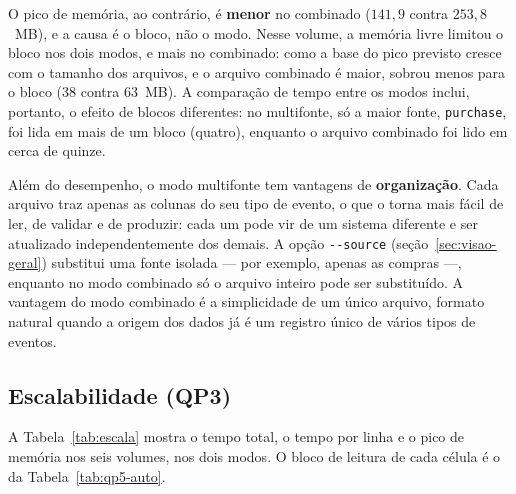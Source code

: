 O pico de memória, ao contrário, é \textbf{menor} no combinado ($141{,}9$ contra
$253{,}8$~MB), e a causa é o bloco, não o modo. Nesse volume, a memória livre limitou o
bloco nos dois modos, e mais no combinado: como a base do pico previsto cresce com o tamanho
dos arquivos, e o arquivo combinado é maior, sobrou menos para o bloco (38 contra 63~MB). A
comparação de tempo entre os modos inclui, portanto, o efeito de blocos diferentes: no
multifonte, só a maior fonte, \texttt{purchase}, foi lida em mais de um bloco (quatro),
enquanto o arquivo combinado foi lido em cerca de quinze.

Além do desempenho, o modo multifonte tem vantagens de \textbf{organização}. Cada arquivo
traz apenas as colunas do seu tipo de evento, o que o torna mais fácil de ler, de validar e
de produzir: cada um pode vir de um sistema diferente e ser atualizado independentemente
dos demais. A opção \texttt{-{}-source} (seção~\ref{sec:visao-geral}) substitui uma fonte
isolada --- por exemplo, apenas as compras ---, enquanto no modo combinado só o arquivo
inteiro pode ser substituído. A vantagem do modo combinado é a simplicidade de um único
arquivo, formato natural quando a origem dos dados já é um registro único de vários tipos
de eventos.

\subsection{Escalabilidade (QP3)}
\label{sec:res-escala}

A Tabela~\ref{tab:escala} mostra o tempo total, o tempo por linha e o pico de memória nos
seis volumes, nos dois modos. O bloco de leitura de cada célula é o da
Tabela~\ref{tab:qp5-auto}.

